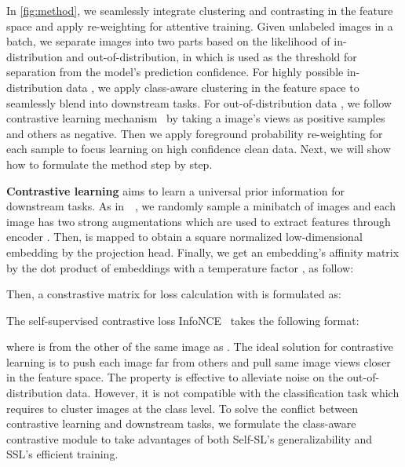 \documentclass[10pt,twocolumn,letterpaper]{article}
\begin{document}
In \cref{fig:method}, we seamlessly integrate clustering and contrasting in the feature space and apply re-weighting for attentive training. Given unlabeled images in a batch, we separate images into two parts based on the likelihood of in-distribution and out-of-distribution, in which  is used as the threshold for separation from the model's prediction confidence.  For highly possible in-distribution data , we apply class-aware clustering in the feature space to seamlessly blend into downstream tasks. For out-of-distribution data , we follow contrastive learning mechanism~\cite{chen2020simple} by taking a image's views as positive samples and others as negative. Then we apply foreground probability re-weighting for each sample to focus learning on high confidence clean data. Next, we will show how to formulate the method step by step. 

\textbf{Contrastive learning} aims to learn a universal prior information for downstream tasks. As in~\cite{he2020momentum}~\cite{chen2020simple}, we randomly sample a minibatch of  images and each image   has two strong augmentations  which are used to extract features  through encoder . Then,  is mapped to obtain a square normalized low-dimensional embedding  by the projection head. Finally, we get an embedding's affinity matrix  by the dot product of embeddings  with a temperature factor , as follow:  

Then, a constrastive matrix  for loss calculation with  is formulated as:


The self-supervised contrastive loss InfoNCE~\cite{oord2018representation} takes the following format:


where  is from the other  of the same image as . The ideal solution for contrastive learning is to push each image far from others and pull same image views closer in the feature space. The property is effective to alleviate noise on the out-of-distribution data. However, it is not compatible with the classification task which requires to cluster images at the class level. To solve the conflict between contrastive learning and downstream tasks, we formulate the class-aware contrastive module to take advantages of both Self-SL's generalizability and SSL's efficient training.
\end{document}
